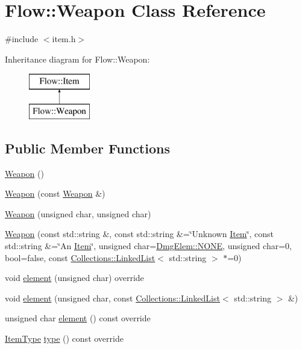 \hypertarget{class_flow_1_1_weapon}{}\section{Flow\+:\+:Weapon Class Reference}
\label{class_flow_1_1_weapon}


{\ttfamily \#include $<$item.\+h$>$}

Inheritance diagram for Flow\+:\+:Weapon\+:\begin{figure}[H]
\begin{center}
\leavevmode
\includegraphics[height=2.000000cm]{class_flow_1_1_weapon}
\end{center}
\end{figure}
\subsection*{Public Member Functions}
\begin{DoxyCompactItemize}
\item 
\hyperlink{class_flow_1_1_weapon_ad522593046c51ee386ff98da6bc050cb}{Weapon} ()
\item 
\hyperlink{class_flow_1_1_weapon_a07aaf63f1e08014a451d36a675b5cf89}{Weapon} (const \hyperlink{class_flow_1_1_weapon}{Weapon} \&)
\item 
\hyperlink{class_flow_1_1_weapon_ab533e5af85bbd0d5a852005dfadc192b}{Weapon} (unsigned char, unsigned char)
\item 
\hyperlink{class_flow_1_1_weapon_a92f807e27a072edeafc7e49154b7da78}{Weapon} (const std\+::string \&, const std\+::string \&=\char`\"{}Unknown \hyperlink{class_flow_1_1_item}{Item}\char`\"{}, const std\+::string \&=\char`\"{}An \hyperlink{class_flow_1_1_item}{Item}\char`\"{}, unsigned char=\hyperlink{namespace_flow_1_1_dmg_elem_a2c7180f371963927ddcc5b333568a33b}{Dmg\+Elem\+::\+N\+O\+NE}, unsigned char=0, bool=false, const \hyperlink{class_collections_1_1_linked_list}{Collections\+::\+Linked\+List}$<$ std\+::string $>$ $\ast$=0)
\item 
void \hyperlink{class_flow_1_1_weapon_a5e008e915610d3ba9d38fed417c807b8}{element} (unsigned char) override
\item 
void \hyperlink{class_flow_1_1_weapon_a37b7081fb155f49bf6af4ab4fdbf5d85}{element} (unsigned char, const \hyperlink{class_collections_1_1_linked_list}{Collections\+::\+Linked\+List}$<$ std\+::string $>$ \&)
\item 
unsigned char \hyperlink{class_flow_1_1_weapon_a7bf5d4c7fe9132615ae906c1992e3e53}{element} () const override
\item 
\hyperlink{namespace_flow_a09368c0b65b3d1bc5c227ed1046c8bca}{Item\+Type} \hyperlink{class_flow_1_1_weapon_afa86ebc4b8803a970425c947f96e7c94}{type} () const override
\end{DoxyCompactItemize}

